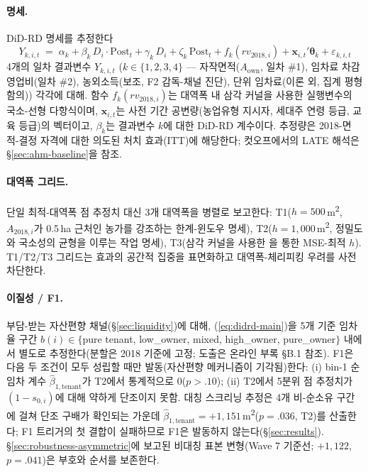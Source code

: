 \documentclass[12pt, a4paper]{article}
\begin{document}
\paragraph{명세.} DiD-RD 명세를 추정한다
\begin{equation}
Y_{k,i,t} \;=\; \alpha_k + \beta_k\, D_i \cdot \text{Post}_t + \gamma_k\, D_i + \zeta_k\, \text{Post}_t + f_k(rv_{2018,i}) + \mathbf{x}_{i,t}'\boldsymbol\theta_k + \varepsilon_{k,i,t}
\label{eq:didrd-main}
\end{equation}
4개의 일차 결과변수 $Y_{k,i,t}$ ($k \in \{1, 2, 3, 4\}$ — 자작면적($A_{\text{own}}$, 일차 \#1), 임차료 차감 영업비(일차 \#2), 농외소득(보조, F2 감독-채널 진단), 단위 임차료(이론 외, 집계 평형 함의)) 각각에 대해. 함수 $f_k(rv_{2018,i})$는 대역폭 내 삼각 커널을 사용한 실행변수의 국소-선형 다항식이며, $\mathbf{x}_{i,t}$는 사전 기간 공변량(농업유형 지시자, 세대주 연령 등급, 교육 등급)의 벡터이고, $\beta_k$는 결과변수 $k$에 대한 DiD-RD 계수이다. 추정량은 2018-면적-결정 자격에 대한 의도된 처치 효과(ITT)에 해당한다; 컷오프에서의 LATE 해석은 \S\ref{sec:ahm-baseline}을 참조.

\paragraph{대역폭 그리드.} 단일 최적-대역폭 점 추정치 대신 3개 대역폭을 병렬로 보고한다: T1($h = 500$\,m\textsuperscript{2}, $A_{2018,i}$가 0.5\,ha 근처인 농가를 강조하는 한계-윈도우 명세), T2($h = 1{,}000$\,m\textsuperscript{2}, 정밀도와 국소성의 균형을 이루는 작업 명세), T3(삼각 커널을 사용한 \citealp{CalonicoCattaneoTitiunik2014_rdrobust}을 통한 MSE-최적 $h$). T1/T2/T3 그리드는 효과의 공간적 집중을 표면화하고 대역폭-체리피킹 우려를 사전 차단한다.

\paragraph{이질성 / F1.} 부담-받는 자산편향 채널(\S\ref{sec:liquidity})에 대해, (\ref{eq:didrd-main})을 5개 기준 임차율 구간 $b(i) \in \{$pure tenant, low\_owner, mixed, high\_owner, pure\_owner$\}$ 내에서 별도로 추정한다(분할은 2018 기준에 고정; 도출은 온라인 부록 \S B.1 참조). F1은 다음 두 조건이 모두 성립할 때만 발동(자산편향 메커니즘이 기각됨)한다: (i) bin-1 순임차 계수 $\hat\beta_{1,\text{tenant}}$가 T2에서 통계적으로 0($p > .10$); (ii) T2에서 5분위 점 추정치가 $(1 - s_{0,i})$에 대해 약하게 단조이지 못함. 대칭 스크리닝 추정은 4개 비-순소유 구간에 걸쳐 단조 구배가 확인되는 가운데 $\hat\beta_{1,\text{tenant}} = +1{,}151$\,m\textsuperscript{2}($p = .036$, T2)를 산출한다; F1 트리거의 첫 결합이 실패하므로 F1은 발동하지 않는다(\S\ref{sec:results}). \S\ref{sec:robustness-asymmetric}에 보고된 비대칭 표본 변형(Wave 7 기준선; $+1{,}122$, $p = .041$)은 부호와 순서를 보존한다.
\end{document}

